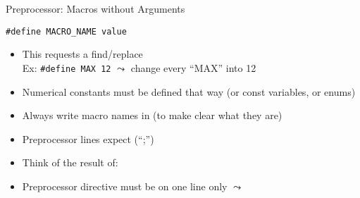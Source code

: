 \begin{frame}{Preprocessor: Macros without Arguments}
  \begin{block}{\texttt{\#define MACRO\_NAME value}}
    \begin{itemize}
    \item This requests a \alert{find/replace}\\
      Ex: \texttt{\#define MAX 12} $\leadsto$ change every ``MAX'' into 12
    \item Numerical constants must be defined that way (or const variables, or enums)
    \item Always write macro names in  (to make clear what they are)
    \item Preprocessor lines expect  (``;'')
    \item {} Think of the result
      of:\\
    \item Preprocessor directive must be on one line only $\leadsto$ 
    \end{itemize}
  \end{block}
\end{frame}
